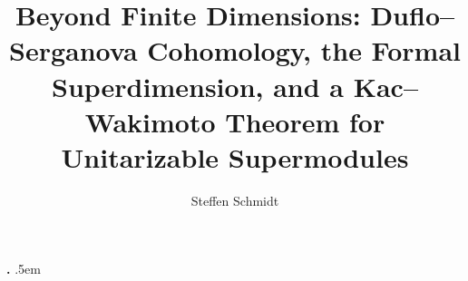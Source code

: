 \makeatletter
\newcommand{\mylabel}[2]{#2\def\@currentlabel{#2}\label{#1}}
\makeatother

\makeatletter
\newcommand{\Mac}{}
\DeclareRobustCommand{\Mac}{%
  M%
  \raisebox{\dimexpr\fontcharht\font`M-\height}{%
    \check@mathfonts\fontsize{\sf@size}{0}\selectfont
    c%
  }%
}
\makeatother



  {}%
  {}%
  {\itshape}%
  {}%
  {\bfseries}%
  {\textbf{.}}%
  {.5em}%
  {}%


\theoremstyle{plain}
\newtheorem{theorem}{Theorem}
\newtheorem{question}[theorem]{Question}
\newtheorem{lemma}[theorem]{Lemma}
\newtheorem{corollary}[theorem]{Corollary}
\newtheorem{assumption}[theorem]{Assumption}
\newtheorem{set}[theorem]{Setting}
\newtheorem{bigthm}{Theorem}
\renewcommand{\thebigthm}{\Alph{bigthm}} 

\newtheorem{proposition}[theorem]{Proposition}

\theoremstyle{remark}
\newtheorem{example}[theorem]{Example}


\theoremstyle{definition}
\newtheorem{conjecture}[theorem]{Conjecture}
\newtheorem{definition}[theorem]{Definition}

\newtheorem{hypothesis}[theorem]{Hypothesis}

\newtheorem*{problem}{Problem}

\theoremstyle{remark}
\newtheorem{remark}[theorem]{Remark}
\newtheorem*{claim}{Claim}
\newtheorem{step}[stepcounter]{Step}

{\theoremstyle{citing}
\newtheorem*{custom}{}}


{\theoremstyle{definition}
\newtheorem{Ex}[theorem]{Example}}



\title[]{Beyond Finite Dimensions:
Duflo--Serganova Cohomology,
the Formal Superdimension, and a Kac--Wakimoto Theorem for Unitarizable Supermodules}

\author{Steffen Schmidt}
\address{Center for Quantum Mathematics, 
University of Southern Denmark, DK-5230 Odense, Denmark}





\let\origmaketitle\maketitle
\def\maketitle{
  \begingroup
  \def\uppercasenonmath##1{} %
  \let\MakeUppercase\relax %
  \origmaketitle
  \endgroup
}


